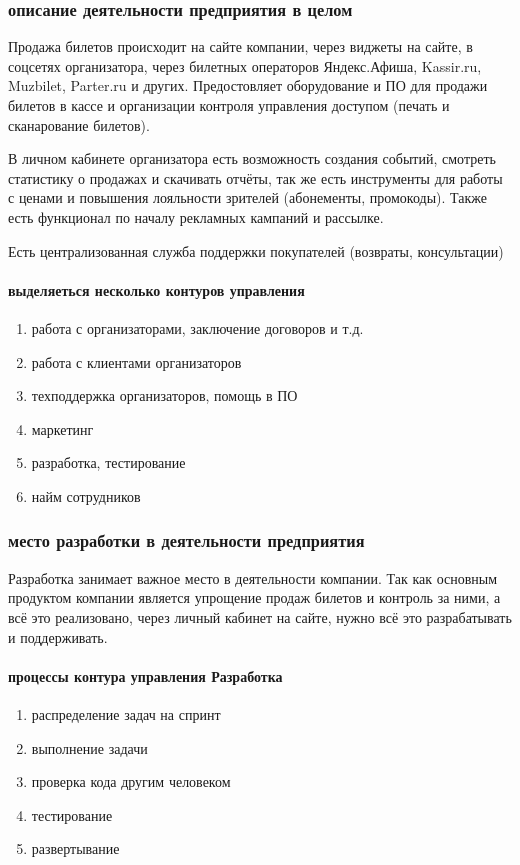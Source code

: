 \documentclass{article}
\begin{document}
\subsubsection{описание деятельности предприятия в целом}
Продажа билетов происходит на сайте компании, через виджеты на сайте, в соцсетях организатора,
через билетных операторов Яндекс.Афиша, Kassir.ru, Muzbilet, Parter.ru и других.
Предостовляет оборудование и ПО для продажи билетов в кассе
и организации контроля управления доступом (печать и сканарование билетов).

В личном кабинете организатора есть возможность создания событий,
смотреть статистику о продажах и скачивать отчёты, так же есть
инструменты для работы с ценами и повышения лояльности зрителей (абонементы, промокоды).
Также есть функционал по началу рекламных кампаний и рассылке.

Есть централизованная служба поддержки покупателей (возвраты, консультации)

\paragraph{выделяеться несколько контуров управления}
\begin{enumerate}
    \item{работа с организаторами, заключение договоров и т.д.}
    \item{работа с клиентами организаторов}
    \item{техподдержка организаторов, помощь в ПО}
    \item{маркетинг}
    \item{разработка, тестирование}
    \item{найм сотрудников}
\end{enumerate}

\subsubsection{место разработки в деятельности предприятия}

Разработка занимает важное место в деятельности компании.
Так как основным продуктом компании является упрощение продаж билетов и контроль
за ними, а всё это реализовано, через личный кабинет на сайте, нужно всё это разрабатывать
и поддерживать.

\paragraph{процессы контура управления Разработка}
\begin{enumerate}
    \item{распределение задач на спринт}
    \item{выполнение задачи}
    \item{проверка кода другим человеком}
    \item{тестирование}
    \item{развертывание}
\end{enumerate}
\end{document}
